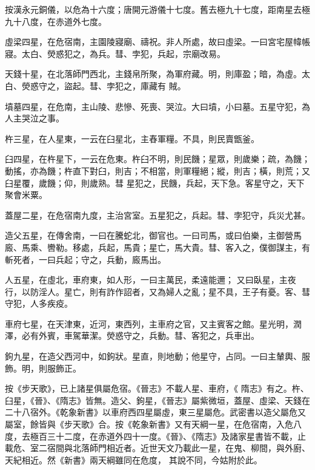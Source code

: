 \begin{pinyinscope}
 按漢永元銅儀，以危為十六度；唐開元游儀十七度。舊去極九十七度，距南星去極九十八度，在赤道外七度。



 虛梁四星，在危宿南，主園陵寢廟、禱祝。非人所處，故曰虛梁。一曰宮宅屋幃帳寢。太白、熒惑犯之，為兵。彗、孛犯，兵起，宗廟改易。



 天錢十星，在北落師門西北，主錢帛所聚，為軍府藏。明，則庫盈；暗，為虛。太白、熒惑守之，盜起。彗、孛犯之，庫藏有
 賊。



 墳墓四星，在危南，主山陵、悲慘、死喪、哭泣。大曰墳，小曰墓。五星守犯，為人主哭泣之事。



 杵三星，在人星東，一云在臼星北，主舂軍糧。不具，則民賣甑釜。



 臼四星，在杵星下，一云在危東。杵臼不明，則民饑；星眾，則歲樂；疏，為饑；動搖，亦為饑；杵直下對臼，則吉；不相當，則軍糧絕；縱，則吉；橫，則荒；又臼星覆，歲饑；仰，則歲熟。彗
 星犯之，民饑，兵起，天下急。客星守之，天下聚會米粟。



 蓋屋二星，在危宿南九度，主治宮室。五星犯之，兵起。彗、孛犯守，兵災尤甚。



 造父五星，在傳舍南，一曰在騰蛇北，御官也。一曰司馬，或曰伯樂，主御營馬廄、馬乘、轡勒。移處，兵起，馬貴；星亡，馬大貴。彗、客入之，僕御謀主，有斬死者，一曰兵起；守之，兵動，廄馬出。



 人五星，在虛北，車府東，如人形，一曰主萬民，柔遠能邇；
 又曰臥星，主夜行，以防淫人。星亡，則有詐作詔者，又為婦人之亂；星不具，王子有憂。客、彗守犯，人多疾疫。



 車府七星，在天津東，近河，東西列，主車府之官，又主賓客之館。星光明，潤澤，必有外賓，車駕華潔。熒惑守之，兵動。彗、客犯之，兵車出。



 鉤九星，在造父西河中，如鉤狀。星直，則地動；他星守，占同。一曰主輦輿、服飾。明，則服飾正。



 按《步天歌》，已上諸星俱屬危宿。《晉志》不載人星、車府，《
 隋志》有之。杵、臼星，《晉》、《隋志》皆無。造父、鉤星，《晉志》屬紫微垣，蓋屋、虛梁、天錢在二十八宿外。《乾象新書》以車府西四星屬虛，東三星屬危。武密書以造父屬危又屬室，餘皆與《步天歌》合。按《乾象新書》又有天綱一星，在危宿南，入危八度，去極百三十二度，在赤道外四十一度。《晉》、《隋志》及諸家星書皆不載，止載危、室二宿間與北落師門相近者。近世天文乃載此一星，在鬼、柳間，與外廚、天紀相近。然《新書》兩天綱雖同在危度，
 其說不同，今姑附於此。




\end{pinyinscope}
